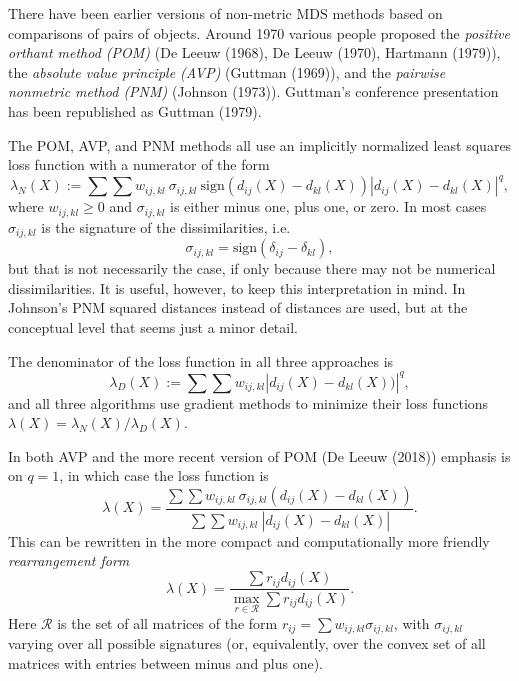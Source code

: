 \documentclass[
  12pt,
]{article}
\begin{document}
There have been earlier versions of non-metric MDS methods based
on comparisons of pairs of objects. Around 1970 various people proposed the \emph{positive orthant method (POM)} (De Leeuw (1968), De Leeuw (1970), Hartmann (1979)), the \emph{absolute value principle (AVP)} (Guttman (1969)), and the
\emph{pairwise nonmetric method (PNM)} (Johnson (1973)). Guttman's conference
presentation has been republished as Guttman (1979).

The POM, AVP, and PNM methods all use an implicitly normalized least squares loss function with a numerator of the form
\begin{equation}
\lambda_N(X):=\sum\sum w_{ij,kl}\ \sigma_{ij,kl}\ \text{sign}(d_{ij}(X)-d_{kl}(X))|d_{ij}(X)-d_{kl}(X)|^q,
\label{eq:pom}
\end{equation}
where \(w_{ij,kl}\geq 0\) and \(\sigma_{ij,kl}\) is either minus one, plus one, or
zero. In most cases \(\sigma_{ij,kl}\) is the signature of the dissimilarities, i.e.
\begin{equation}
\sigma_{ij,kl}=\text{sign}(\delta_{ij}-\delta_{kl}),
\label{eq:sijkl}
\end{equation}
but that is not necessarily the case, if only because there may not be numerical dissimilarities. It is useful, however, to keep this interpretation in mind. In Johnson's PNM squared distances instead of distances are used, but at the conceptual level that seems just a minor detail.

The denominator of the loss function in all three approaches is
\begin{equation}
\lambda_D(X):=\sum\sum w_{ij,kl}|d_{ij}(X)-d_{kl}(X))|^q,
\label{eq:lambdad}
\end{equation}
and all three algorithms use gradient methods to minimize their loss functions
\(\lambda(X)=\lambda_N(X)/\lambda_D(X)\).

In both AVP and the more recent version of POM (De Leeuw (2018)) emphasis is on
\(q=1\), in which case the loss function is
\begin{equation}
\lambda(X)=\frac{\sum\sum w_{ij,kl}\ \sigma_{ij,kl}(d_{ij}(X)-d_{kl}(X))}{\sum\sum w_{ij,kl}\ |d_{ij}(X)-d_{kl}(X)|}.
\label{eq:lambda1}
\end{equation}
This can be rewritten in the more compact and computationally more friendly \emph{rearrangement form}
\begin{equation}
\lambda(X)=\frac{\sum r_{ij}d_{ij}(X)}{\max_{r\in\mathcal{R}}\sum r_{ij}d_{ij}(X)}.
\label{eq:rearrange}
\end{equation}
Here \(\mathcal{R}\) is the set of all matrices of the form \(r_{ij}=\sum w_{ij,kl}\sigma_{ij,kl}\), with \(\sigma_{ij,kl}\) varying over all possible
signatures (or, equivalently, over the convex set of all matrices with entries between minus and plus one).
\end{document}
